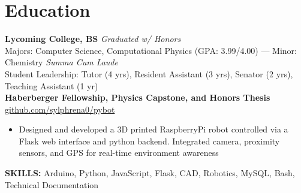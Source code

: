 \documentclass[11pt]{article}       %
\begin{document}


\vspace{-18.5pt}

\section*{Education}
\textbf{Lycoming College, BS} \hfill \textit{Graduated w/ Honors} \\
Majors: Computer Science, Computational Physics (GPA: 3.99/4.00) --- Minor: Chemistry \hfill \textit{Summa Cum Laude} \\
Student Leadership: Tutor (4 yrs), Resident Assistant (3 yrs), Senator (2 yrs), Teaching Assistant (1 yr) \\

\vspace{9pt}
\textbf{Haberberger Fellowship, Physics Capstone, and Honors Thesis} \hfill \href{https://github.com/sylphrena0/pybot}{github.com/sylphrena0/pybot} \\
\vspace{-9pt}
\begin{itemize}[leftmargin=0.35in]
  \item Designed and developed a 3D printed RaspberryPi robot controlled via a Flask web interface and python backend. Integrated camera, proximity sensors, and GPS for real-time environment awareness
\end{itemize}
\vspace{-9pt}
\textbf{SKILLS:} Arduino, Python, JavaScript, Flask, CAD, Robotics, MySQL, Bash, Technical Documentation
\vspace{9pt}
\end{document}

